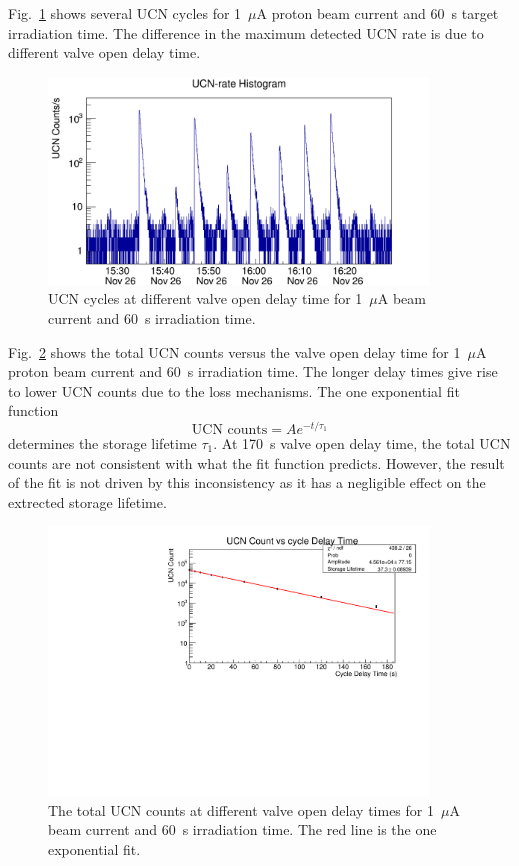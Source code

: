 Fig.~\ref{fig:storage_all} shows several UCN cycles for 1~$\mu$A
proton beam current and 60~s target irradiation time. The difference
in the maximum detected UCN rate is due to different valve open delay
time.
\begin{figure}[h!]
  \centering
  \includegraphics[width=0.9\textwidth]{storagetime_all.png}
  \caption{UCN cycles at different valve open delay time for 1~$\mu$A
    beam current and 60~s irradiation time.}
  \label{fig:storage_all}
\end{figure}
Fig.~\ref{fig:storage_example} shows the total UCN counts versus the
valve open delay time for 1~$\mu$A proton beam current and 60~s irradiation
time. The longer delay times give rise to lower UCN counts due to the
loss mechanisms. The one exponential fit function
\begin{equation}
\text{UCN counts} = A e^{-t/\tau_1}
\end{equation}
determines the storage lifetime $\tau_1$. At 170~s valve open delay
time, the total UCN counts are not consistent with what the fit
function predicts. However, the result of the fit is not driven by
this inconsistency as it has a negligible effect on the extrected
storage lifetime.

\begin{figure}[h!]
  \centering
  \includegraphics[width=0.9\textwidth]{17002_StorageLifetime.pdf}
  \caption{The total UCN counts at different valve open delay times
    for 1~$\mu$A beam current and 60~s irradiation time. The red line
    is the one exponential fit. }
  \label{fig:storage_example}
\end{figure}


